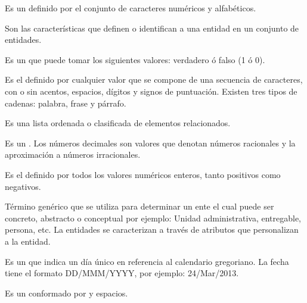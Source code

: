 \begin{description}

	 Es un  definido por el conjunto de caracteres numéricos y alfabéticos.
	
	
	 Son las características que definen o identifican a una entidad en un conjunto de entidades.
	
	 Es un  que puede tomar los siguientes valores: verdadero ó falso (1 ó 0).
	
	 Es el  definido por cualquier valor que se compone de una secuencia de caracteres, con o sin acentos, espacios, dígitos y signos de puntuación. Existen tres tipos de cadenas: palabra, frase y párrafo.
	
	 Es una lista ordenada o clasificada de elementos relacionados.
	
	 Es un  . Los números decimales son valores que denotan números racionales y la aproximación a números irracionales.
	
	 Es el   definido por todos los valores numéricos enteros, tanto positivos como negativos.
	
	 Término genérico que se utiliza para determinar un ente el cual puede ser concreto, abstracto o conceptual por ejemplo: Unidad administrativa, entregable, persona, etc. La entidades se caracterizan a través de atributos que personalizan a la entidad.		
	
	 Es un  que indica un día único en referencia al calendario gregoriano. La fecha tiene el formato DD/MMM/YYYY, por ejemplo: 24/Mar/2013.
	
	
	 Es un   conformado por  y espacios.
	

\end{description}
